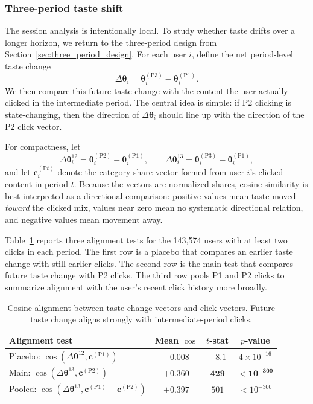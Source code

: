 \documentclass[11pt]{article}
\begin{document}
\subsubsection{Three-period taste shift}
\label{sec:three_period}

The session analysis is intentionally local. To study whether taste drifts over a longer horizon, we return to the three-period design from Section~\ref{sec:three_period_design}. For each user $i$, define the net period-level taste change
\[
\Delta\boldsymbol{\theta}_i
=
\boldsymbol{\theta}_i^{(\mathrm{P3})}
-
\boldsymbol{\theta}_i^{(\mathrm{P1})}.
\]
We then compare this future taste change with the content the user actually clicked in the intermediate period. The central idea is simple: if P2 clicking is state-changing, then the direction of $\Delta\boldsymbol{\theta}_i$ should line up with the direction of the P2 click vector.

For compactness, let
\[
\Delta\boldsymbol{\theta}_i^{12}
=
\boldsymbol{\theta}_i^{(\mathrm{P2})}
-
\boldsymbol{\theta}_i^{(\mathrm{P1})},
\qquad
\Delta\boldsymbol{\theta}_i^{13}
=
\boldsymbol{\theta}_i^{(\mathrm{P3})}
-
\boldsymbol{\theta}_i^{(\mathrm{P1})},
\]
and let $\mathbf{c}_i^{(\mathrm{P}t)}$ denote the category-share vector formed from user $i$'s clicked content in period $t$. Because the vectors are normalized shares, cosine similarity is best interpreted as a directional comparison: positive values mean taste moved \emph{toward} the clicked mix, values near zero mean no systematic directional relation, and negative values mean movement away.

Table~\ref{tab:taste_alignment} reports three alignment tests for the 143,574 users with at least two clicks in each period. The first row is a placebo that compares an earlier taste change with still earlier clicks. The second row is the main test that compares future taste change with P2 clicks. The third row pools P1 and P2 clicks to summarize alignment with the user's recent click history more broadly.

\begin{table}[ht]
\centering
\caption{Cosine alignment between taste-change vectors and click vectors. Future taste change aligns strongly with intermediate-period clicks.}
\label{tab:taste_alignment}
\begin{tabular}{lccc}
\toprule
Alignment test & Mean $\cos$ & $t$-stat & $p$-value \\
\midrule
Placebo: $\cos(\Delta\boldsymbol{\theta}^{12}, \mathbf{c}^{(\mathrm{P1})})$ & $-0.008$ & $-8.1$ & $4 \times 10^{-16}$ \\
Main: $\cos(\Delta\boldsymbol{\theta}^{13}, \mathbf{c}^{(\mathrm{P2})})$ & $\boldsymbol{+0.360}$ & $\boldsymbol{429}$ & $\boldsymbol{< 10^{-300}}$ \\
Pooled: $\cos(\Delta\boldsymbol{\theta}^{13}, \mathbf{c}^{(\mathrm{P1})}{+}\mathbf{c}^{(\mathrm{P2})})$ & $+0.397$ & $501$ & $< 10^{-300}$ \\
\bottomrule
\end{tabular}
\end{table}
\FloatBarrier
\end{document}
